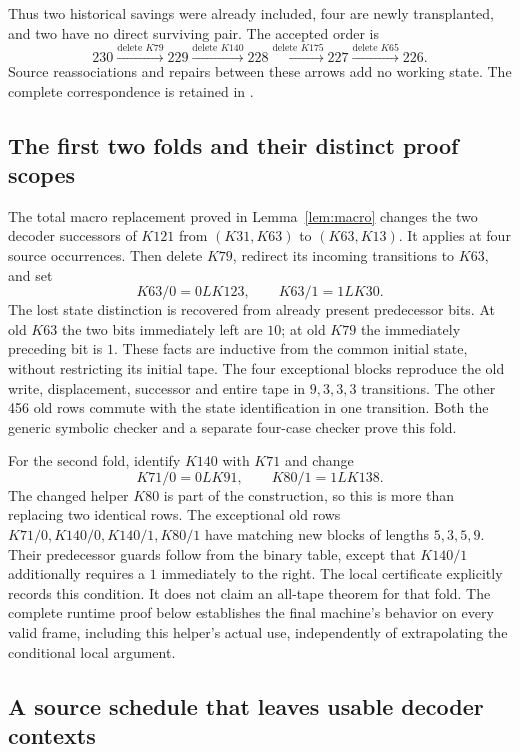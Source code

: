 Thus two historical savings were already included, four are newly
transplanted, and two have no direct surviving pair.  The accepted order is
\[
 230\xrightarrow{\text{delete }K79}229
 \xrightarrow{\text{delete }K140}228
 \xrightarrow{\text{delete }K175}227
 \xrightarrow{\text{delete }K65}226.
\]
Source reassociations and repairs between these arrows add no working
state.  The complete correspondence is retained in
.

\subsection{The first two folds and their distinct proof scopes}

The total macro replacement proved in Lemma~\ref{lem:macro} changes the
two decoder successors of $K121$ from $(K31,K63)$ to $(K63,K13)$.
It applies at four source occurrences.  Then delete $K79$, redirect its
incoming transitions to $K63$, and set
\[
 K63/0=0LK123,\qquad K63/1=1LK30.
\]
The lost state distinction is recovered from already present predecessor
bits.  At old $K63$ the two bits immediately left are $10$; at old $K79$
the immediately preceding bit is $1$.  These facts are inductive from
the common initial state, without restricting its initial tape.
The four exceptional blocks reproduce the old write, displacement,
successor and entire tape in $9,3,3,3$ transitions.  The other 456 old
rows commute with the state identification in one transition.  Both the
generic symbolic checker and a separate four-case checker prove this fold.

For the second fold, identify $K140$ with $K71$ and change
\[
 K71/0=0LK91,\qquad K80/1=1LK138.
\]
The changed helper $K80$ is part of the construction, so this is more
than replacing two identical rows.  The exceptional old rows
$K71/0,K140/0,K140/1,K80/1$ have matching new blocks of lengths
$5,3,5,9$.  Their predecessor guards follow from the binary table,
except that $K140/1$ additionally requires a $1$ immediately to the right.
The local certificate explicitly records this condition.  It does not
claim an all-tape theorem for that fold.  The complete runtime proof
below establishes the final machine's behavior on every valid frame,
including this helper's actual use, independently of extrapolating
the conditional local argument.

\subsection{A source schedule that leaves usable decoder contexts}

